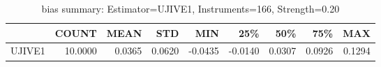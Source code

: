 \begin{table}[ht]
\centering
\caption{bias summary: Estimator=UJIVE1, Instruments=166, Strength=0.20}
\begin{tabular}{lrrrrrrrr}
\toprule
 & COUNT & MEAN & STD & MIN & 25\% & 50\% & 75\% & MAX \\
\midrule
UJIVE1 & 10.0000 & 0.0365 & 0.0620 & -0.0435 & -0.0140 & 0.0307 & 0.0926 & 0.1294 \\
\bottomrule
\end{tabular}
\end{table}
